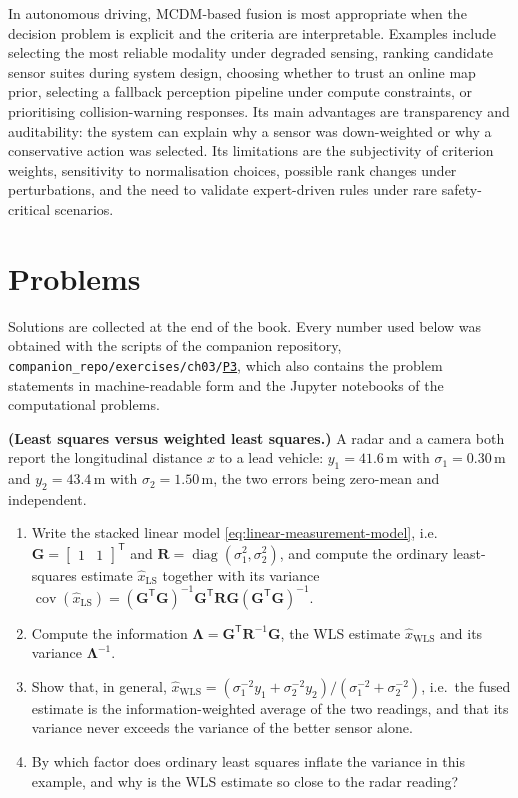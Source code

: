 \documentclass[graybox,envcountchap]{style/SNmono}
\DeclareMathOperator{\diag}{diag}
\newcommand{\problemsection}{\section*{Problems}\addcontentsline{toc}{section}{Problems}}
\newcommand{\repopath}[1]{\texttt{#1}}
\providecommand{\DIFadd}[1]{{\protect\color{blue} #1}} %
\providecommand{\DIFdel}[1]{{\protect\color{red} #1}} %
\DeclareRobustCommand{\RtwoDel}[1]{{\color{red}%
  \renewcommand{\DIFadd}[1]{##1}\renewcommand{\DIFdel}[1]{##1}%
  #1}}
\DeclareRobustCommand{\RtwoAdd}[1]{{\color{blue}#1}}
\DeclareRobustCommand{\codeentry}[1]{\hyperref[code:#1]{\texttt{#1}}}
\begin{document}
In autonomous driving, MCDM-based fusion is most appropriate when the decision problem is explicit and the criteria are interpretable. Examples include selecting the most reliable modality under degraded sensing, ranking candidate sensor suites during system design, choosing whether to trust an online map prior, selecting a fallback perception pipeline under compute constraints, or prioritising collision-warning responses. Its main advantages are transparency and auditability: the system can explain why a sensor was down-weighted or why a conservative action was selected. Its limitations are the subjectivity of criterion weights, sensitivity to normalisation choices, possible rank changes under perturbations, and the need to validate expert-driven rules under rare safety-critical scenarios.

\problemsection
Solutions are collected at the end of the book. Every number used below was obtained with the scripts of the companion repository, \RtwoDel{\repopath{companion\_\allowbreak repo/\allowbreak exercises/\allowbreak ch03/\allowbreak }}\RtwoAdd{\codeentry{P3}}, which also contains the problem statements in machine-readable form and the Jupyter notebooks of the computational problems.

\begin{prob}\label{prob:ch03:1}
\textbf{(Least squares versus weighted least squares.)} A radar and a camera both report the longitudinal distance $x$ to a lead vehicle: $y_1=41.6$\,m with $\sigma_1=0.30$\,m and $y_2=43.4$\,m with $\sigma_2=1.50$\,m, the two errors being zero-mean and independent.
\begin{enumerate}
\item[(a)] Write the stacked linear model \eqref{eq:linear-measurement-model}, i.e.\ $\mathbf{G}=\begin{bmatrix}1&1\end{bmatrix}^{\mathsf T}$ and $\mathbf{R}=\diag(\sigma_1^{2},\sigma_2^{2})$, and compute the ordinary least-squares estimate $\widehat{x}_{\mathrm{LS}}$ together with its variance $\operatorname{cov}(\widehat{x}_{\mathrm{LS}})=(\mathbf{G}^{\mathsf T}\mathbf{G})^{-1}\mathbf{G}^{\mathsf T}\mathbf{R}\mathbf{G}(\mathbf{G}^{\mathsf T}\mathbf{G})^{-1}$.
\item[(b)] Compute the information $\mathbf{\Lambda}=\mathbf{G}^{\mathsf T}\mathbf{R}^{-1}\mathbf{G}$, the WLS estimate $\widehat{x}_{\mathrm{WLS}}$ and its variance $\mathbf{\Lambda}^{-1}$.
\item[(c)] Show that, in general, $\widehat{x}_{\mathrm{WLS}}=(\sigma_1^{-2}y_1+\sigma_2^{-2}y_2)/(\sigma_1^{-2}+\sigma_2^{-2})$, i.e.\ the fused estimate is the information-weighted average of the two readings, and that its variance never exceeds the variance of the better sensor alone.
\item[(d)] By which factor does ordinary least squares inflate the variance in this example, and why is the WLS estimate so close to the radar reading?
\end{enumerate}
\end{prob}
\end{document}
